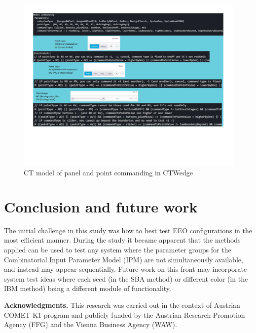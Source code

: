 \documentclass[conference]{IEEEtran}
\begin{document}
	\begin{figure}[!h]
		\centering
			\includegraphics[width=1.05\textwidth,]{modelCommanding.pdf}
			\caption{CT model of panel and point commanding in CTWedge}
			\label{fig:modelCommanding}
	\end{figure}

	

\section{Conclusion and future work}
	
The initial challenge in this study was how to best test EEO configurations in the most efficient manner.
During the study it became apparent that the methods applied can be used to test any system where the parameter groups for
the Combinatorial Input Parameter Model (IPM) are not simultaneously available, and instead may appear sequentially.
Future work on this front may incorporate system test ideas where each seed (in the SBA method) or different color (in the IBM method) being a different module of functionality.

\textbf{Acknowledgments.}
This research was carried out in the context of Austrian COMET K1
program and publicly funded by the Austrian Research Promotion Agency
(FFG) and the Vienna Business Agency (WAW).



\end{document}
